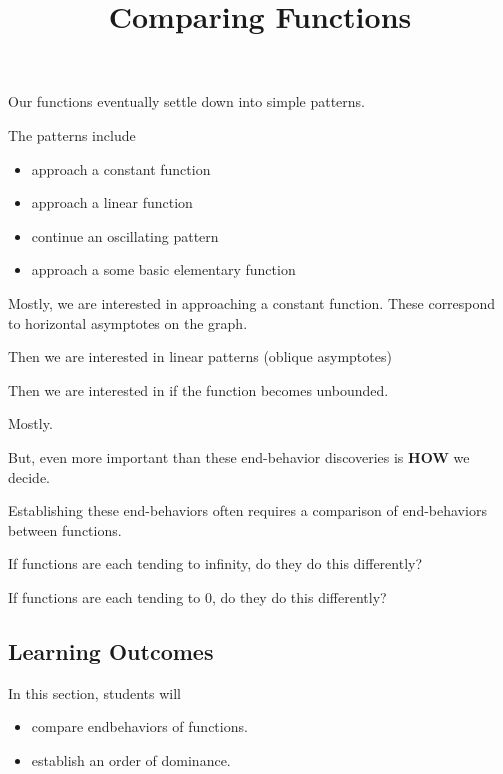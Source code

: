 \documentclass{ximera}
\title{Comparing Functions}
\begin{document}
\begin{abstract}
\end{abstract}
\maketitle







Our functions eventually settle down into simple patterns.  

The patterns include

\begin{itemize}
\item approach a constant function
\item approach a linear function
\item continue an oscillating pattern
\item approach a some basic elementary function 
\end{itemize}


Mostly, we are interested in approaching a constant function.  These correspond to horizontal asymptotes on the graph.

Then we are interested in linear patterns (oblique asymptotes)

Then we are interested in if the function becomes unbounded.

Mostly.


But, even more important than these end-behavior discoveries is \textbf{HOW} we decide.

Establishing these end-behaviors often requires a comparison of end-behaviors between functions.  


If functions are each tending to infinity, do they do this differently?


If functions are each tending to $0$, do they do this differently?















\subsection{Learning Outcomes}


\begin{sectionOutcomes}
In this section, students will 

\begin{itemize}
\item compare endbehaviors of functions.
\item establish an order of dominance.
\end{itemize}
\end{sectionOutcomes}
\end{document}
